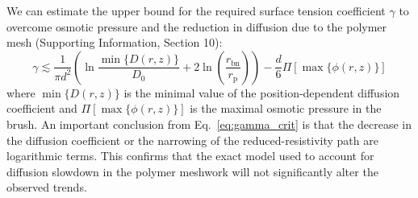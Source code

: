 \documentclass[12pt, a4paper]{article}
\begin{document}

We can estimate the upper bound for the required surface tension coefficient $\gamma$ to overcome osmotic pressure and the reduction in diffusion due to the polymer mesh (Supporting Information, Section 10):
\begin{equation}
    \label{eq:gamma_crit}
    \gamma \lesssim \frac{1}{\pi d^2} \left( \ln\frac{\min\{D(r,z)\}}{D_0} + 2\ln\left( \frac{r_{\text{bn}}}{r_{\text{p}}} \right) \right) - \frac{d}{6}\Pi\left[\max\{\phi(r,z)\}\right]
\end{equation}
where $\min\{D(r,z)\}$ is the minimal value of the position-dependent diffusion coefficient and $\Pi\left[\max\{\phi(r,z)\}\right]$ is the maximal osmotic pressure in the brush.
An important conclusion from Eq.~\ref{eq:gamma_crit} is that the decrease in the diffusion coefficient or the narrowing of the reduced-resistivity path are logarithmic terms.
This confirms that the exact model used to account for diffusion slowdown in the polymer meshwork will not significantly alter the observed trends.


\end{document}

